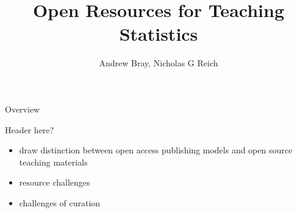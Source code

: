 

\title{Open Resources for Teaching Statistics }
\newcommand{\ModuleShortname}{}
\author{Andrew Bray, Nicholas G Reich}
\newcommand{\LicenseText}{Made available under the Creative Commons Attribution-ShareAlike 3.0 Unported License: http://creativecommons.org/licenses/by-sa/3.0/deed.en\textunderscore US }
\newcommand{\Instructor}{UMass-Amherst Prbability and Statistics Seminar Series}
\newcommand{\Course}{7 April 2014}






\begin{frame}[plain]
	\titlepage
\end{frame}





\begin{frame}{Overview}

	\begin{block}{Header here?}

		\begin{itemize}

			\item draw distinction between open access publishing models and open source teaching materials
                        \item resource challenges
                        \item challenges of curation
		\end{itemize}

	\end{block}

\end{frame}

